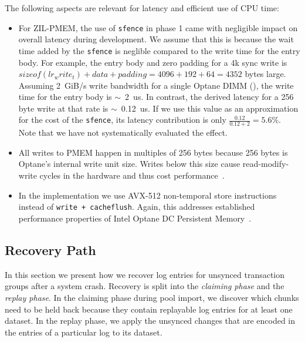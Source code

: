 \documentclass[12pt,a4paper,twoside]{book}
\begin{document}
The following aspects are relevant for latency and efficient use of CPU time:
\begin{itemize}[noitemsep]
    \item For ZIL-PMEM, the use of \lstinline{sfence} in phase 1 came with negligible impact on overall latency during development.
        We assume that this is because the wait time added by the \lstinline{sfence} is neglible compared to the write time for the entry body.
        For example, the entry body and zero padding for a 4k sync write is $sizeof(lr_write_t) + data + padding = 4096 + 192 + 64 = 4352$ bytes large.
        Assuming \SI{2}{GiB/s} write bandwidth for a single Optane DIMM (\cite{yangEmpiricalGuideBehavior2020}), the write time for the entry body is $\sim$~\SI{2}{us}.
        In contrast, the derived latency for a 256 byte write at that rate is $\sim$~\SI{0.12}{us}.
        If we use this value as an approximation for the cost of the \lstinline{sfence}, its latency contribution is only $\frac{0.12}{0.12 + 2} = 5.6\%$.
        Note that we have not systematically evaluated the effect.
    \item All writes to PMEM happen in multiples of 256 bytes because 256 bytes is Optane's internal write unit size.
        Writes below this size cause read-modify-write cycles in the hardware and thus cost performance~\cite{yangEmpiricalGuideBehavior2020,zhangChameleonDBKeyvalueStore2021}.
    \item In the implementation we use AVX-512 non-temporal store instructions instead of \lstinline{write + cacheflush}.
        Again, this addresses established performance properties of Intel Optane DC Persistent Memory~\cite{yangEmpiricalGuideBehavior2020}.
\end{itemize}

\subsection{Recovery Path}\label{di:prb:recovery}
In this section we present how we recover log entries for unsynced transaction groups after a system crash.
Recovery is split into the \textit{claiming phase} and the \textit{replay phase}.
In the claiming phase during pool import, we discover which chunks need to be held back because they contain replayable log entries for at least one dataset.
In the replay phase, we apply the unsynced changes that are encoded in the entries of a particular log to its dataset.
\end{document}
